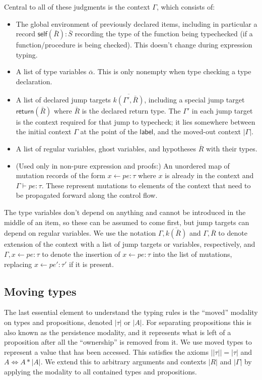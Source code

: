 \documentclass[acmsmall,nonacm]{acmart}
\newcommand{\core}[1]{\left| #1 \right|}
\newcommand{\proves}{\vdash}
\begin{document}
Central to all of these judgments is the context $\Gamma$, which consists of:
\begin{itemize}
  \item The global environment of previously declared items, including in particular a record $\mathsf{self}(\bar R):\bar S$ recording the type of the function being typechecked (if a function/procedure is being checked). This doesn't change during expression typing.
  \item A list of type variables $\overline{\alpha}$. This is only nonempty when type checking a type declaration.
  \item A list of declared jump targets $\overline{k(\Gamma',\bar{R})}$, including a special jump target $\mathsf{return}(\bar{R})$ where $\bar{R}$ is the declared return type. The $\Gamma'$ in each jump target is the context required for that jump to typecheck; it lies somewhere between the initial context $\Gamma$ at the point of the $\mathsf{label}$, and the moved-out context $\core{\Gamma}$.
  \item A list of regular variables, ghost variables, and hypotheses $\overline{R}$ with their types.
  \item (Used only in non-pure expression and proofs:) An unordered map of mutation records of the form $x\gets pe:\tau$ where $x$ is already in the context and $\Gamma\proves pe:\tau$. These represent mutations to elements of the context that need to be propagated forward along the control flow.
\end{itemize}
The type variables don't depend on anything and cannot be introduced in the middle of an item, so these can be assumed to come first, but jump targets can depend on regular variables. We use the notation $\Gamma,\overline{k(\bar{R})}$ and $\Gamma,\overline{R}$ to denote extension of the context with a list of jump targets or variables, respectively, and $\Gamma,x\gets pe:\tau$ to denote the insertion of $x\gets pe:\tau$ into the list of mutations, replacing $x\gets pe':\tau'$ if it is present.

\subsection{Moving types}\label{sec:moving}

The last essential element to understand the typing rules is the ``moved'' modality on types and propositions, denoted $\core\tau$ or $\core A$. For separating propositions this is also known as the persistence modality, and it represents what is left of a proposition after all the ``ownership'' is removed from it. We use moved types to represent a value that has been accessed. This satisfies the axioms $\core{\core\tau}=\core\tau$ and $A\Leftrightarrow A\ast\core A$. We extend this to arbitrary arguments and contexts $\core R$ and $\core\Gamma$ by applying the modality to all contained types and propositions.
\end{document}
